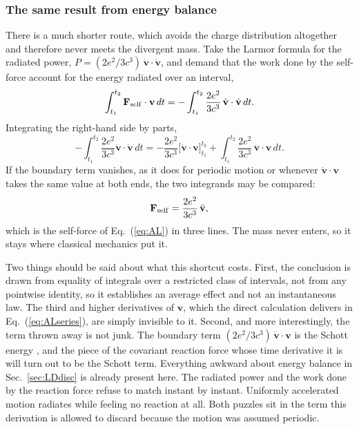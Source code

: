 \documentclass[preprint]{aastex701}
\begin{document}
\subsubsection{The same result from energy balance}
\label{sec:enbal}

There is a much shorter route, which avoids the charge distribution altogether
and therefore never meets the divergent mass. Take the Larmor formula \citep{larmor1897} for the
radiated power, $P = (2e^2/3c^3)\,\dot{\mathbf v}\cdot\dot{\mathbf v}$, and
demand that the work done by the self-force account for the energy radiated over
an interval,
\begin{equation}
\int_{t_1}^{t_2}\mathbf F_{\rm self}\cdot\mathbf v\,dt
= -\int_{t_1}^{t_2}\frac{2e^2}{3c^3}\,
\dot{\mathbf v}\cdot\dot{\mathbf v}\,dt .
\label{eq:enbalance}
\end{equation}
Integrating the right-hand side by parts,
\begin{equation}
-\int_{t_1}^{t_2}\frac{2e^2}{3c^3}\dot{\mathbf v}\cdot\dot{\mathbf v}\,dt
= -\frac{2e^2}{3c^3}\Big[\dot{\mathbf v}\cdot\mathbf v\Big]_{t_1}^{t_2}
+ \int_{t_1}^{t_2}\frac{2e^2}{3c^3}\,\ddot{\mathbf v}\cdot\mathbf v\,dt .
\label{eq:byparts}
\end{equation}
If the boundary term vanishes, as it does for periodic motion or whenever
$\dot{\mathbf v}\cdot\mathbf v$ takes the same value at both ends, the two
integrands may be compared:
\begin{equation}
\mathbf F_{\rm self} = \frac{2e^2}{3c^3}\,\ddot{\mathbf v},
\label{eq:ALshort}
\end{equation}
which is the self-force of Eq.~(\ref{eq:AL}) in three lines. The mass never
enters, so it stays where classical mechanics put it.

Two things should be said about what this shortcut costs. First, the conclusion
is drawn from equality of integrals over a restricted class of intervals, not
from any pointwise identity, so it establishes an average effect and not an
instantaneous law. The third and higher derivatives of $\mathbf v$, which the
direct calculation delivers in Eq.~(\ref{eq:ALseries}), are simply invisible to
it. Second, and more interestingly, the term thrown away is not junk. The
boundary term $(2e^2/3c^3)\,\dot{\mathbf v}\cdot\mathbf v$ is the Schott energy \citep{schott1912},
and the piece of the covariant reaction force whose time derivative it is will
turn out to be the Schott term. Everything awkward about energy balance in
Sec.~\ref{sec:LDdisc} is already present here. The radiated power and the work
done by the reaction force refuse to match instant by instant. Uniformly
accelerated motion radiates while feeling no reaction at all. Both puzzles sit
in the term this derivation is allowed to discard because the motion was assumed
periodic.
\end{document}
